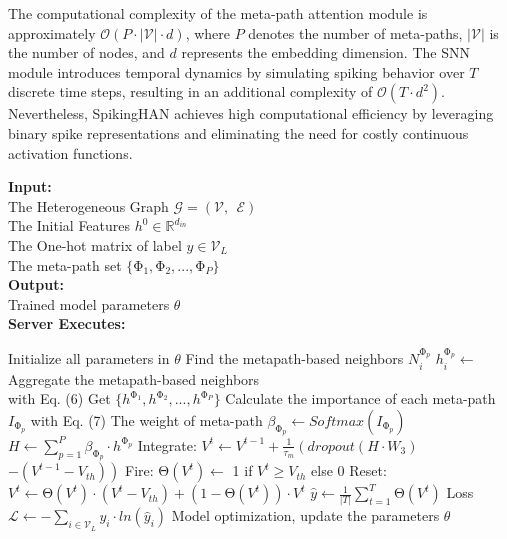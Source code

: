 \documentclass[letterpaper]{article} %
\begin{document}
The computational complexity of the meta-path attention module is approximately $\mathcal{O}(P \cdot |\mathcal{V}| \cdot d)$, where $P$ denotes the number of meta-paths, $|\mathcal{V}|$ is the number of nodes, and $d$ represents the embedding dimension. The SNN module introduces temporal dynamics by simulating spiking behavior over $T$ discrete time steps, resulting in an additional complexity of $\mathcal{O}(T \cdot d^2)$. Nevertheless, SpikingHAN achieves high computational efficiency by leveraging binary spike representations and eliminating the need for costly continuous activation functions.
\begin{algorithm}[h]
\caption{Model Training of SpikingHAN}
\label{alg1}
\textbf{Input:} \\ \small
The Heterogeneous Graph $ \mathcal{G}=(\mathcal{V},\ \ \mathcal{E})$ \\
The Initial Features $h^0\in\mathbb{R}^{d_{in}}$ \\
The One-hot matrix of label $y\in\mathcal{V}_L$\\
The meta-path set $\{\mathrm{\Phi}_1,\mathrm{\Phi}_2,...,\mathrm{\Phi}_P\}$\\
\textbf{Output:} \\
Trained model parameters $\theta$ \\
\textbf{Server Executes:} 
\begin{algorithmic}[1] %
\State Initialize all parameters in $\theta$
\State Find the metapath-based neighbors $N_i^{\mathrm{\Phi}_p}$
\State $h_i^{\mathrm{\Phi}_p} \leftarrow$ Aggregate the metapath-based neighbors\\
\hspace*{6.3em}with Eq. (6)
\EndFor
\EndFor
\State Get $\{h^{\mathrm{\Phi}_1},h^{\mathrm{\Phi}_2},...,h^{\mathrm{\Phi}_P}\}$
\State Calculate the importance of each meta-path $I_{\mathrm{\Phi}_p}$ with Eq. (7)
\State The weight of meta-path $\beta_{\mathrm{\Phi}_p} \gets Softmax(I_{\mathrm{\Phi}_p})$
\State $H\gets  \sum_{p=1}^{P}{\beta_{\mathrm{\Phi}_p}\cdot}h^{\mathrm{\Phi}_p}$
\State Integrate: $V^t\gets  V^{t-1}+\frac{1}{\tau_m}\left(dropout(H\cdot W_3)\right.$\\
\hspace*{5.5em}$\left.-(V^{t-1}-V_{th})\right)$
\State Fire: $\mathrm{\Theta}\left(V^t\right)\gets$  1 if $V^t\geq V_{th}$ else 0
\State Reset: $V^t\gets  \mathrm{\Theta}\left(V^t\right)\cdot(V^t-V_{th})+(1-\mathrm{\Theta}\left(V^t\right))\cdot V^t$
\EndFor
\State $\hat{y}\gets  \frac{1}{\left|T\right|}\sum_{t=1}^{T}\mathrm{\Theta}\left(V^t\right)$
\State Loss $\mathcal{L}\gets  -\sum_{i\in\mathcal{V}_L} y_i\cdot ln\left({\hat{y}}_i\right)$
\State Model optimization, update the parameters $\theta$
\State {}
\end{algorithmic}
\end{algorithm}
\end{document}
